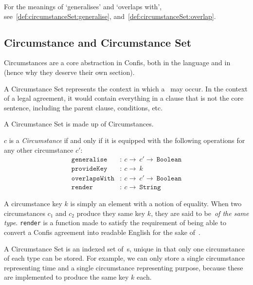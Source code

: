 For the meanings of `generalises' and `overlaps with', see~\autoref{def:circumstanceSet:generalise}, and~\autoref{def:circumstanceSet:overlap}.

\subsection{Circumstance and Circumstance Set}\label{subsec:circumstance}

Circumstances are a core abstraction in Confis, both in the language and in~ (hence why they deserve their own section).

A Circumstance Set represents the context in which a~ may occur.
In the context of a legal agreement, it would contain everything in a clause that is not the core sentence, including the parent clause, conditions, etc.

A Circumstance Set is made up of Circumstances.


\begin{definition}[Circumstance]
    \label{def:circumstance}
    $c$ is a \emph{Circumstance} if and only if it is equipped with the following operations for any other circumstance $c'$:
    \begin{align}
        \label{def:c:generalise}
        \texttt{generalise}&: \ c \to\ c' \to\ \texttt{Boolean}\\
        \label{def:c:provideKey}
        \texttt{provideKey}&: \ c \to\ k\\
        \label{def:c:overlap}
        \texttt{overlapsWith}&:\ c \to\ c' \to\ \texttt{Boolean}\\
        \label{def:c:render}
        \texttt{render}&: \ c \to\ \texttt{String}
    \end{align}
\end{definition}

A circumstance key $k$ is simply an element with a notion of equality.
When two circumstances $c_1$ and $c_2$ produce they same key $k$, they are said to be~\emph{of the same type}.
\texttt{render} is a function made to satisfy the requirement of being able to convert a Confis agreement into readable English for the sake of~.

A Circumstance Set is an indexed set of~s, unique in that only one circumstance of each type can be stored.
For example, we can only store a single circumstance representing time and a single circumstance representing purpose, because these are implemented to produce the same key $k$ each.

